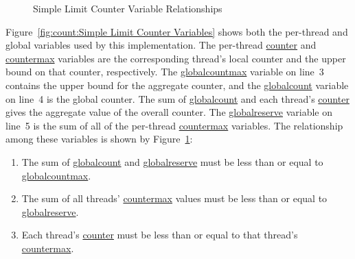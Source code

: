 \begin{figure}[tb]
\begin{center}
\end{center}
\caption{Simple Limit Counter Variable Relationships}
\label{fig:count:Simple Limit Counter Variable Relationships}
\end{figure}

Figure~\ref{fig:count:Simple Limit Counter Variables}
shows both the per-thread and global variables used by this
implementation.
The per-thread \url{counter} and \url{countermax} variables are the
corresponding thread's local counter and the upper bound on that
counter, respectively.
The \url{globalcountmax} variable on line~3 contains the upper
bound for the aggregate counter, and the \url{globalcount} variable
on line~4 is the global counter.
The sum of \url{globalcount} and each thread's \url{counter} gives
the aggregate value of the overall counter.
The \url{globalreserve} variable on line~5 is the sum of all of the
per-thread \url{countermax} variables.
The relationship among these variables is shown by
Figure~\ref{fig:count:Simple Limit Counter Variable Relationships}:
\begin{enumerate}
\item	The sum of \url{globalcount} and \url{globalreserve} must
	be less than or equal to \url{globalcountmax}.
\item	The sum of all threads' \url{countermax} values must be
	less than or equal to \url{globalreserve}.
\item	Each thread's \url{counter} must be less than or equal to
	that thread's \url{countermax}.
\end{enumerate}

